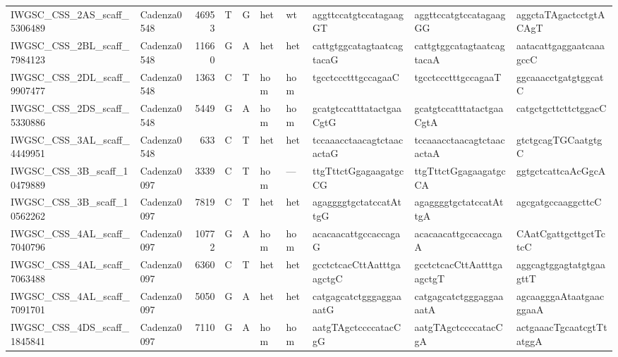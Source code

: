\begin{longtable}{llrlllllll}
 IWGSC\_CSS\_2AS\_scaff\_5306489  & Cadenza0548 &      46953 & T         & G        & het            & wt          & aggttccatgtccatagaagGT    & aggttccatgtccatagaagGG    & aggctaTAgactcctgtACAgT    \\
 IWGSC\_CSS\_2BL\_scaff\_7984123  & Cadenza0548 &      11660 & G         & A        & het            & het         & cattgtggcatagtaatcagtacaG & cattgtggcatagtaatcagtacaA & aatacattgaggaatcaaagccC   \\
 IWGSC\_CSS\_2DL\_scaff\_9907477  & Cadenza0548 &       1363 & C         & T        & hom            & hom         & tgcctccctttgccagaaC       & tgcctccctttgccagaaT       & ggcaaacctgatgtggcatC      \\
 IWGSC\_CSS\_2DS\_scaff\_5330886  & Cadenza0548 &       5449 & G         & A        & hom            & hom         & gcatgtccatttatactgaaCgtG  & gcatgtccatttatactgaaCgtA  & catgctgcttcttctggacC      \\
 IWGSC\_CSS\_3AL\_scaff\_4449951  & Cadenza0548 &        633 & C         & T        & het            & het         & tccaaacctaacagtctaacactaG & tccaaacctaacagtctaacactaA & gtctgcagTGCaatgtgC        \\
 IWGSC\_CSS\_3B\_scaff\_10479889  & Cadenza0097 &       3339 & C         & T        & hom            & ---         & ttgTttctGgagaagatgcCG     & ttgTttctGgagaagatgcCA     & ggtgctcattcaAcGgcA        \\
 IWGSC\_CSS\_3B\_scaff\_10562262  & Cadenza0097 &       7819 & C         & T        & het            & het         & agaggggtgctatccatAttgG    & agaggggtgctatccatAttgA    & agcgatgccaaggcttcC        \\
 IWGSC\_CSS\_4AL\_scaff\_7040796  & Cadenza0097 &      10772 & G         & A        & hom            & hom         & acacaacattgccaccagaG      & acacaacattgccaccagaA      & CAatCgattgcttgctTctcC     \\
 IWGSC\_CSS\_4AL\_scaff\_7063488  & Cadenza0097 &       6360 & C         & T        & het            & het         & gcctctcacCttAatttgaagctgC & gcctctcacCttAatttgaagctgT & aggcagtggagtatgtgaagttT   \\
 IWGSC\_CSS\_4AL\_scaff\_7091701  & Cadenza0097 &       5050 & G         & A        & het            & het         & catgagcatctgggaggaaaatG   & catgagcatctgggaggaaaatA   & agcaagggaAtaatgaacggaaA   \\
 IWGSC\_CSS\_4DS\_scaff\_1845841  & Cadenza0097 &       7110 & G         & A        & hom            & hom         & aatgTAgctccccatacCgG      & aatgTAgctccccatacCgA      & actgaaacTgcaatcgtTtatggA  \\

\end{longtable}
